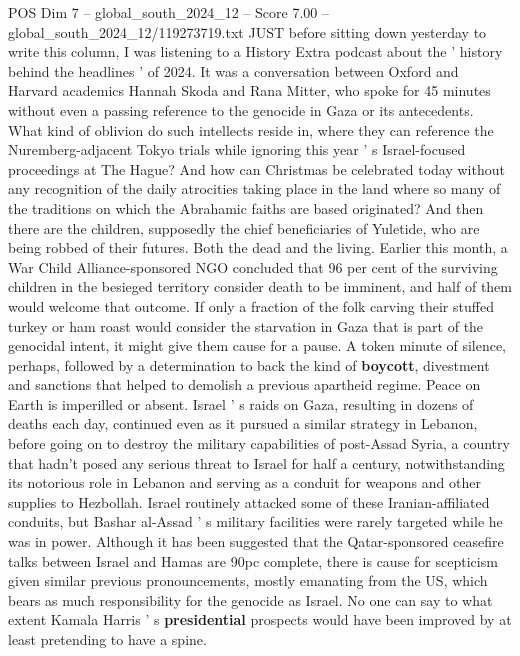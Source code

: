 \begin{textsample}{POS Dim 7 – global\_south\_2024\_12 – Score 7.00 – global\_south\_2024\_12/119273719.txt}  \label{ex:f7_pos_349}
JUST before sitting down yesterday to write this column, I was listening to a History Extra podcast about the ' history behind the headlines ' of 2024.
It was a conversation between Oxford and Harvard academics Hannah Skoda and Rana Mitter, who spoke for 45 minutes without even a passing reference to the genocide in Gaza or its antecedents.
What kind of oblivion do such intellects reside in, where they can reference the Nuremberg-adjacent Tokyo trials while ignoring this year ' s Israel-focused proceedings at The Hague?
And how can Christmas be celebrated today without any recognition of the daily atrocities taking place in the land where so many of the traditions on which the Abrahamic faiths are based originated?
And then there are the children, supposedly the chief beneficiaries of Yuletide, who are being robbed of their futures.
Both the dead and the living.
Earlier this month, a War Child Alliance-sponsored NGO concluded that 96 per cent of the surviving children in the besieged territory consider death to be imminent, and half of them would welcome that outcome.
If only a fraction of the folk carving their stuffed turkey or ham roast would consider the starvation in Gaza that is part of the genocidal intent, it might give them cause for a pause.
A token minute of silence, perhaps, followed by a determination to back the kind of \textbf{boycott}, divestment and sanctions that helped to demolish a previous apartheid regime.
Peace on Earth is imperilled or absent.
Israel ' s raids on Gaza, resulting in dozens of deaths each day, continued even as it pursued a similar strategy in Lebanon, before going on to destroy the military capabilities of post-Assad Syria, a country that hadn't posed any serious threat to Israel for half a century, notwithstanding its notorious role in Lebanon and serving as a conduit for weapons and other supplies to Hezbollah.
Israel routinely attacked some of these Iranian-affiliated conduits, but Bashar al-Assad ' s military facilities were rarely targeted while he was in power.
Although it has been suggested that the Qatar-sponsored ceasefire talks between Israel and Hamas are 90pc complete, there is cause for scepticism given similar previous pronouncements, mostly emanating from the US, which bears as much responsibility for the genocide as Israel.
No one can say to what extent Kamala Harris ' s \textbf{presidential} prospects would have been improved by at least pretending to have a spine.

\end{textsample}
